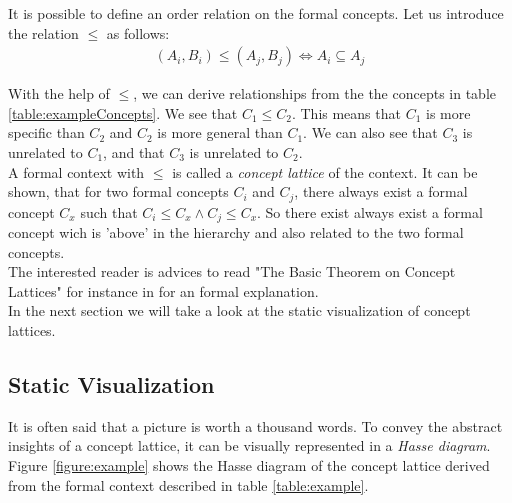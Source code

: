 \documentclass[11pt]{report}
\begin{document}
It is possible to define an order relation on the formal concepts. Let us introduce the relation $\le$ as follows:
\begin{align*} (A_i,B_i) \le (A_j, B_j) \Longleftrightarrow	A_i \subseteq A_j
\end{align*}

With the help of $\le$, we  can derive relationships from the the concepts in table \ref{table:exampleConcepts}. We see that $C_1 \le C_2$. This means that $C_1$ is more specific than $C_2$ and $C_2$ is more general than $C_1$. We can also see that $C_3$ is unrelated to $C_1$, and that $C_3$ is unrelated to $C_2$. \\

A formal context with $\le$ is called a \textit{concept lattice} of the context. It can be shown, that for two formal concepts $C_i$ and $C_j$, there always exist a formal concept $C_x$ such that $C_i \le C_x \wedge C_j \le C_x$. So there exist always exist a formal concept wich is 'above' in the hierarchy and also related to the two formal concepts. \\ 

The interested reader is advices to read "The Basic Theorem on Concept Lattices" for instance in \cite{carpineto2004concept} for an formal explanation. \\

In the next section we will take a look at the static visualization of concept lattices.

\subsection{Static Visualization}

It is often said that a picture is worth a thousand words. To convey the abstract insights of a concept lattice, it can be visually represented in a \textit{Hasse diagram}. Figure \ref{figure:example} shows the Hasse diagram of the concept lattice derived from the formal context described in table \ref{table:example}. \\
\end{document}
